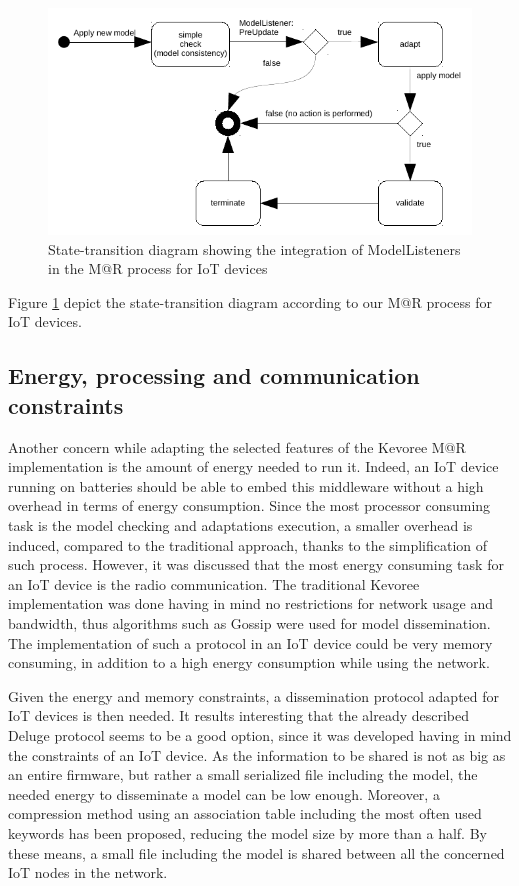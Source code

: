\begin{figure}[]
	\centering
	\includegraphics[width=0.85\columnwidth]{chapters/modelsAtRuntimeContiki.images/modelListenerIoT.pdf}
	\caption{State-transition diagram showing the integration of ModelListeners in the M@R process for IoT devices}
	\label{fig:MAR_modelListenerIoT}
\end{figure}

Figure \ref{fig:MAR_modelListenerIoT} depict the state-transition diagram according to our M@R process for IoT devices.

\subsection{Energy, processing and communication constraints}
\label{subsec:ImplConstraints}
Another concern while adapting the selected features of the Kevoree M@R implementation is the amount of energy needed to run it.
Indeed, an IoT device running on batteries should be able to embed this middleware without a high overhead in terms of energy consumption.
Since the most processor consuming task is the model checking and adaptations execution, a smaller overhead is induced, compared to the traditional approach, thanks to the simplification of such process.
However, it was discussed that the most energy consuming task for an IoT device is the radio communication.
The traditional Kevoree implementation was done having in mind no restrictions for network usage and bandwidth, thus algorithms such as Gossip\cite{fouquet2012dissemination} were used for model dissemination.
The implementation of such a protocol in an IoT device could be very memory consuming, in addition to a high energy consumption while using the network.

Given the energy and memory constraints, a dissemination protocol adapted for IoT devices is then needed.
It results interesting that the already described Deluge protocol\cite{hui2004dynamic} seems to be a good option, since it was developed having in mind the constraints of an IoT device.
As the information to be shared is not as big as an entire firmware, but rather a small serialized file including the model, the needed energy to disseminate a model can be low enough.
Moreover, a compression method using an association table including the most often used keywords has been proposed, reducing the model size by more than a half.
By these means, a small file including the model is shared between all the concerned IoT nodes in the network.

